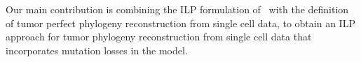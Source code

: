 \documentclass[a4paper,USenglish]{article}
\theoremstyle{definition}
\newtheorem{definition}{Definition}
\begin{document}
Our main contribution is combining the ILP formulation
of~\cite{Bonizzoni:2017:BPP:3107411.3107441} with the definition of
tumor perfect phylogeny reconstruction from single cell data, to
obtain an ILP approach for tumor phylogeny reconstruction from single
cell data that incorporates mutation losses in the model.






 
  
\end{document}
